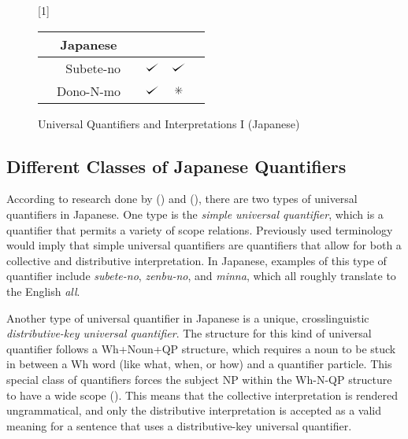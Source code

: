 \documentclass[english, 11pt]{article}
\newcommand{\dwork}{\text{\ding{83}}}
\def\checkmark{\tikz\fill[scale=0.4](0,.35) -- (.25,0) -- (1,.7) -- (.25,.15) -- cycle;}
\begin{document}
\begin{figure}[h]
	\begin{center} \renewcommand*\arraystretch{1.2}
	\scalebox{1}[1]{\begin{tabular}[t]{|rrl||c|c|c|} \hline 
	\multicolumn{3}{|c||}{Japanese} & \sc{Distributive} & \sc{Collective}  \\[0.5ex]
  	 	\hline & Subete-no 		& & $\checkmark$ & $\checkmark$ \\
		\hline & Dono-N-mo		& & $\checkmark$ & $\dwork$ \\
   	 	\hline 
	\end{tabular}} \renewcommand*\arraystretch{1} \end{center}
	\vspace*{-5mm}
	\captionsetup{labelfont=bf}
	\caption[labelfont=bf]{Universal Quantifiers and Interpretations I (Japanese)}
\end{figure}

\subsection{Different Classes of Japanese Quantifiers}
According to research done by (\cite{s2}) and (\cite{s4}), there are two types of universal quantifiers in Japanese. One type is the \emph{simple universal quantifier}, which is a quantifier that permits a variety of scope relations. Previously used terminology would imply that simple universal quantifiers are quantifiers that allow for both a collective and distributive interpretation. In Japanese, examples of this type of quantifier include \emph{subete-no}, \emph{zenbu-no}, and \emph{minna}, which all roughly translate to the English \emph{all}. 

Another type of universal quantifier in Japanese is a unique, crosslinguistic \emph{distributive-key universal quantifier}. The structure for this kind of universal quantifier follows a Wh+Noun+QP structure, which requires a noun to be stuck in between a Wh word (like what, when, or how) and a quantifier particle. This special class of quantifiers forces the subject NP within the Wh-N-QP structure to have a wide scope (\cite{s3}). This means that the collective interpretation is rendered ungrammatical, and only the distributive interpretation is accepted as a valid meaning for a sentence that uses a distributive-key universal quantifier.
\end{document}
